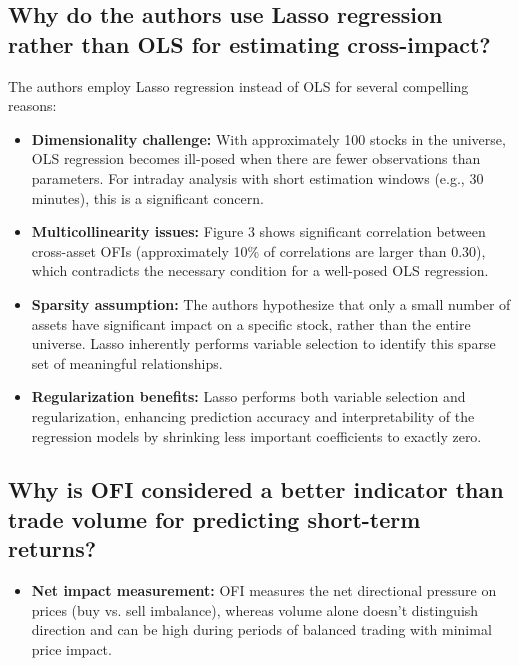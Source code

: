 \documentclass{article}
\begin{document}
\subsection{Why do the authors use Lasso regression rather than OLS for estimating cross-impact?}

The authors employ Lasso regression instead of OLS for several compelling reasons:

\begin{itemize}
    \item \textbf{Dimensionality challenge:} With approximately 100 stocks in the universe, OLS regression becomes ill-posed when there are fewer observations than parameters. For intraday analysis with short estimation windows (e.g., 30 minutes), this is a significant concern.
    
    \item \textbf{Multicollinearity issues:} Figure 3 shows significant correlation between cross-asset OFIs (approximately 10\% of correlations are larger than 0.30), which contradicts the necessary condition for a well-posed OLS regression.
    
    \item \textbf{Sparsity assumption:} The authors hypothesize that only a small number of assets have significant impact on a specific stock, rather than the entire universe. Lasso inherently performs variable selection to identify this sparse set of meaningful relationships.
    
    \item \textbf{Regularization benefits:} Lasso performs both variable selection and regularization, enhancing prediction accuracy and interpretability of the regression models by shrinking less important coefficients to exactly zero.
\end{itemize}

\subsection{Why is OFI considered a better indicator than trade volume for predicting short-term returns?}

\begin{itemize}
    \item \textbf{Net impact measurement:} OFI measures the net directional pressure on prices (buy vs. sell imbalance), whereas volume alone doesn't distinguish direction and can be high during periods of balanced trading with minimal price impact.
\end{itemize}
\end{document}
